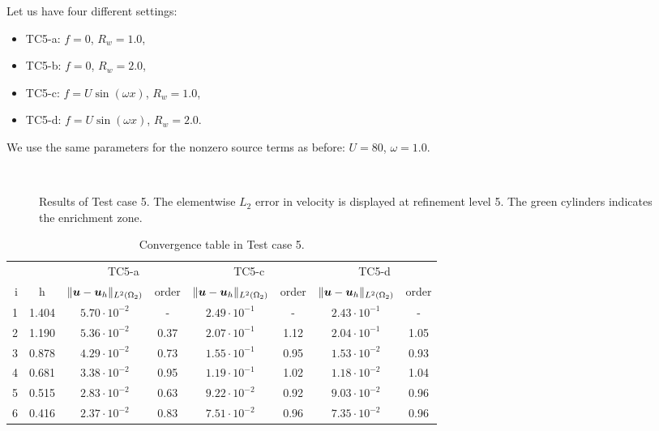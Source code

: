 Let us have four different settings: 
\begin{itemize}
    \item TC5-a: $f=0$, $R_w=1.0$,
    \item TC5-b: $f=0$, $R_w=2.0$,
    \item TC5-c: $f=U\sin(\omega x)$, $R_w=1.0$,
    \item TC5-d: $f=U\sin(\omega x)$, $R_w=2.0$.
\end{itemize}
We use the same parameters for the nonzero source terms as before: $U=80$, $\omega=1.0$.
%
\begin{figure}[!htb]
    \centering
     \\
    \caption[Error distribution in Test case 5.]
    {Results of Test case 5. The elementwise $L_2$ error in velocity is displayed at refinement level 5.
    The green cylinders indicates the enrichment zone. }
    \label{fig:mh_tc5_error}
\end{figure}
%
\begin{table}[!htb]
\begin{center}
\bgroup
\def\arraystretch{1.2}
\setlength\tabcolsep{5pt}
\begin{tabular}{rc|cc|cc|cc}
\toprule
\multicolumn{2}{c|}{} & \multicolumn{2}{c|}{ TC5-a } & \multicolumn{2}{c|}{ TC5-c } & \multicolumn{2}{c}{TC5-d}\\ [3pt] %
i & h & $\|\mathbf{\boldsymbol{u}}-\mathbf{\boldsymbol{u}}_h\|_{L^2(\Omega_2)}$ & order & $\|\mathbf{\boldsymbol{u}}-\mathbf{\boldsymbol{u}}_h\|_{L^2(\Omega_2)}$
    & order & $\|\mathbf{\boldsymbol{u}}-\mathbf{\boldsymbol{u}}_h\|_{L^2(\Omega_2)}$ & order \\ [3pt] \midrule
1 & 1.404 & $5.70\cdot10^{-2}$  &  -   & $2.49\cdot10^{-1}$  &  -   & $2.43\cdot10^{-1}$ &   -   \\
2 & 1.190 & $5.36\cdot10^{-2}$  & 0.37 & $2.07\cdot10^{-1}$  & 1.12 & $2.04\cdot10^{-1}$ &  1.05 \\
3 & 0.878 & $4.29\cdot10^{-2}$  & 0.73 & $1.55\cdot10^{-1}$  & 0.95 & $1.53\cdot10^{-2}$ &  0.93 \\
4 & 0.681 & $3.38\cdot10^{-2}$  & 0.95 & $1.19\cdot10^{-1}$  & 1.02 & $1.18\cdot10^{-2}$ &  1.04 \\
5 & 0.515 & $2.83\cdot10^{-2}$  & 0.63 & $9.22\cdot10^{-2}$  & 0.92 & $9.03\cdot10^{-2}$ &  0.96 \\
6 & 0.416 & $2.37\cdot10^{-2}$  & 0.83 & $7.51\cdot10^{-2}$  & 0.96 & $7.35\cdot10^{-2}$ &  0.96 \\
\bottomrule
\end{tabular}
\caption{Convergence table in Test case 5.}
\label{tab:mh_tc5_convergence}
\egroup
\end{center}
\end{table}

